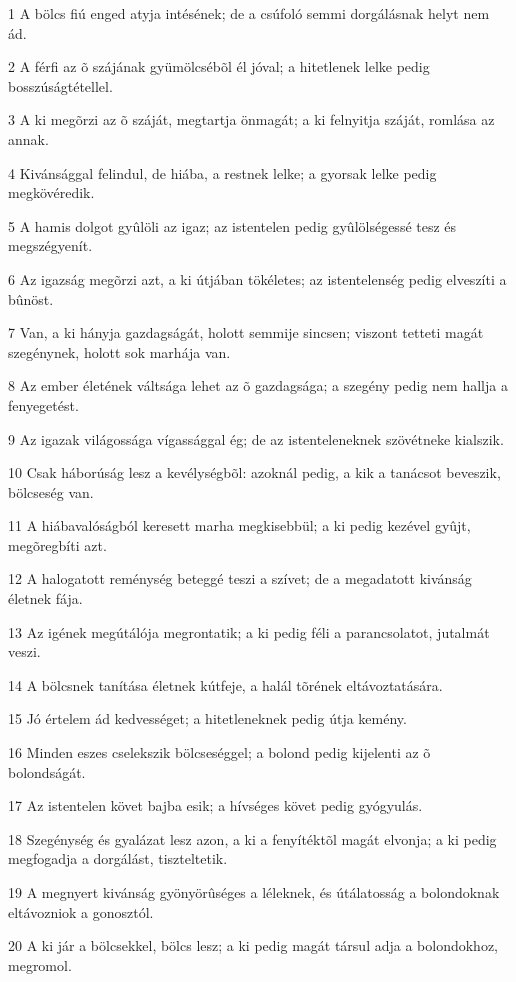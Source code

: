 \par 1 A bölcs fiú enged atyja intésének; de a csúfoló semmi dorgálásnak helyt nem ád.
\par 2 A férfi az õ szájának gyümölcsébõl él jóval; a hitetlenek lelke pedig bosszúságtétellel.
\par 3 A ki megõrzi az õ száját, megtartja önmagát; a ki felnyitja száját, romlása az annak.
\par 4 Kivánsággal felindul, de hiába, a restnek lelke; a gyorsak lelke pedig megkövéredik.
\par 5 A hamis dolgot gyûlöli az igaz; az istentelen pedig gyûlölségessé tesz és megszégyenít.
\par 6 Az igazság megõrzi azt, a ki útjában tökéletes; az istentelenség pedig elveszíti a bûnöst.
\par 7 Van, a ki hányja gazdagságát, holott semmije sincsen; viszont tetteti magát szegénynek, holott sok marhája van.
\par 8 Az ember életének váltsága lehet az õ gazdagsága; a szegény pedig nem hallja a fenyegetést.
\par 9 Az igazak világossága vígassággal ég; de az istenteleneknek  szövétneke kialszik.
\par 10 Csak háborúság lesz a kevélységbõl: azoknál pedig, a kik a tanácsot beveszik, bölcseség van.
\par 11 A hiábavalóságból keresett marha megkisebbül; a ki pedig kezével gyûjt, megõregbíti azt.
\par 12 A halogatott reménység beteggé teszi a szívet; de a megadatott kivánság életnek fája.
\par 13 Az igének megútálója megrontatik; a ki pedig féli a parancsolatot, jutalmát veszi.
\par 14 A bölcsnek tanítása életnek kútfeje,  a halál tõrének eltávoztatására.
\par 15 Jó értelem ád kedvességet; a hitetleneknek pedig útja kemény.
\par 16 Minden eszes cselekszik bölcseséggel; a bolond pedig kijelenti az õ bolondságát.
\par 17 Az istentelen követ bajba esik; a hívséges követ pedig gyógyulás.
\par 18 Szegénység és gyalázat lesz azon, a ki a fenyítéktõl magát elvonja; a ki pedig megfogadja a dorgálást, tiszteltetik.
\par 19 A megnyert kivánság gyönyörûséges a léleknek, és útálatosság a bolondoknak eltávozniok a gonosztól.
\par 20 A ki jár a bölcsekkel, bölcs lesz; a ki pedig magát társul adja a bolondokhoz, megromol.
